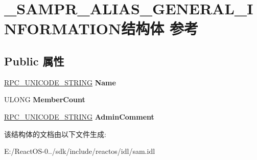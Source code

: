 \hypertarget{struct___s_a_m_p_r___a_l_i_a_s___g_e_n_e_r_a_l___i_n_f_o_r_m_a_t_i_o_n}{}\section{\+\_\+\+S\+A\+M\+P\+R\+\_\+\+A\+L\+I\+A\+S\+\_\+\+G\+E\+N\+E\+R\+A\+L\+\_\+\+I\+N\+F\+O\+R\+M\+A\+T\+I\+O\+N结构体 参考}
\label{struct___s_a_m_p_r___a_l_i_a_s___g_e_n_e_r_a_l___i_n_f_o_r_m_a_t_i_o_n}
\subsection*{Public 属性}
\begin{DoxyCompactItemize}
\item 
\mbox{\label{struct___s_a_m_p_r___a_l_i_a_s___g_e_n_e_r_a_l___i_n_f_o_r_m_a_t_i_o_n_a03e9d8a72bb44ccd283161584e631e00}} 
\hyperlink{struct___r_p_c___u_n_i_c_o_d_e___s_t_r_i_n_g}{R\+P\+C\+\_\+\+U\+N\+I\+C\+O\+D\+E\+\_\+\+S\+T\+R\+I\+NG} {\bfseries Name}
\item 
\mbox{\label{struct___s_a_m_p_r___a_l_i_a_s___g_e_n_e_r_a_l___i_n_f_o_r_m_a_t_i_o_n_a8583d71dfe873a6ca3a741e7b7b489a6}} 
U\+L\+O\+NG {\bfseries Member\+Count}
\item 
\mbox{\label{struct___s_a_m_p_r___a_l_i_a_s___g_e_n_e_r_a_l___i_n_f_o_r_m_a_t_i_o_n_ac88c879682d3995dedc629b8f35468c1}} 
\hyperlink{struct___r_p_c___u_n_i_c_o_d_e___s_t_r_i_n_g}{R\+P\+C\+\_\+\+U\+N\+I\+C\+O\+D\+E\+\_\+\+S\+T\+R\+I\+NG} {\bfseries Admin\+Comment}
\end{DoxyCompactItemize}


该结构体的文档由以下文件生成\+:\begin{DoxyCompactItemize}
\item 
E\+:/\+React\+O\+S-\/0../sdk/include/reactos/idl/sam.\+idl\end{DoxyCompactItemize}
